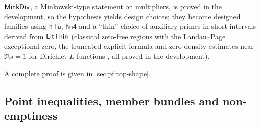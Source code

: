 \begin{proofoutline}
$\mathsf{MinkDiv}$, a Minkowski-type statement on multipliers, is proved in the development, so the hypothesis
yields design choices; they become designed families using $\mathsf{hTu}$, $\mathsf{hn4}$ and a ``thin'' choice of
auxiliary primes in short intervals derived from $\mathsf{LitThin}$ (classical zero-free regions with the
Landau--Page exceptional zero, the truncated explicit formula and zero-density estimates near $\Re s=1$ for
Dirichlet $L$-functions \cite{Davenport2000,Montgomery1971}, all proved in the development).

A complete proof is given in \cref{sec:pf:top-shape}.
\end{proofoutline}

\subsection{Point inequalities, member bundles and non-emptiness}\label{sec:families:nonempty}

